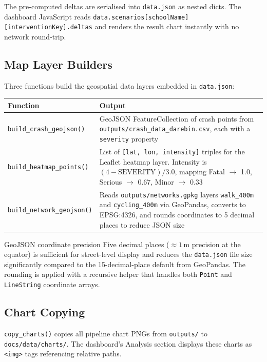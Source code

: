 \documentclass[11pt,a4paper,openany]{book}
\begin{document}
The pre-computed deltas are serialised into \texttt{data.json} as nested dicts.
The dashboard JavaScript reads \texttt{data.scenarios[schoolName][interventionKey].deltas}
and renders the result chart instantly with no network round-trip.

\subsection{Map Layer Builders}

Three functions build the geospatial data layers embedded in \texttt{data.json}:

\begin{center}
\begin{tabular}{lL{9cm}}
\toprule
Function & Output \\
\midrule
\texttt{build\_crash\_geojson()} & GeoJSON FeatureCollection of crash points from
  \texttt{outputs/crash\_data\_darebin.csv}, each with a \texttt{severity} property \\
\texttt{build\_heatmap\_points()} & List of \texttt{[lat, lon, intensity]} triples for
  the Leaflet heatmap layer.  Intensity is $(4 - \text{SEVERITY}) / 3.0$, mapping
  Fatal $\to$ 1.0, Serious $\to$ 0.67, Minor $\to$ 0.33 \\
\texttt{build\_network\_geojson()} & Reads \texttt{outputs/networks.gpkg} layers
  \texttt{walk\_400m} and \texttt{cycling\_400m} via GeoPandas, converts to EPSG:4326,
  and rounds coordinates to 5 decimal places to reduce JSON size \\
\bottomrule
\end{tabular}
\end{center}

\begin{tipbox}{GeoJSON coordinate precision}
Five decimal places ($\approx 1$\,m precision at the equator) is sufficient for
street-level display and reduces the \texttt{data.json} file size significantly
compared to the 15-decimal-place default from GeoPandas.  The rounding is applied
with a recursive helper that handles both \texttt{Point} and \texttt{LineString}
coordinate arrays.
\end{tipbox}

\subsection{Chart Copying}

\texttt{copy\_charts()} copies all pipeline chart PNGs from \texttt{outputs/} to
\texttt{docs/data/charts/}.  The dashboard's Analysis section displays these charts
as \texttt{<img>} tags referencing relative paths.
\end{document}

